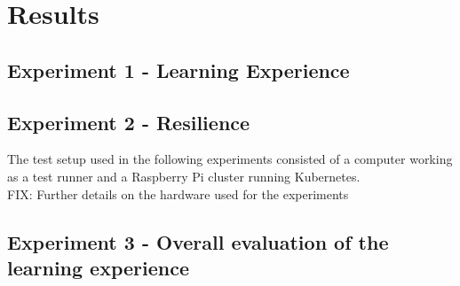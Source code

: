 \chapter{Results}
\label{appendix:c_results}


\section*{Experiment 1 - Learning Experience}





\section*{Experiment 2 - Resilience}
The test setup used in the following experiments consisted of a computer working as a test runner and a Raspberry Pi cluster running Kubernetes. \\
FIX: Further details on the hardware used for the experiments




\section*{Experiment 3 - Overall evaluation of the learning experience}




